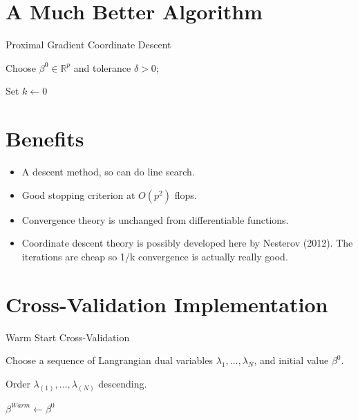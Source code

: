\documentclass[10pt, reqno]{article}
\numberwithin{equation}{section}
\newcommand{\R}{\mathbb{R}}
\begin{document}
\newpage
\section*{A Much Better Algorithm}

\vspace{.5cm}
\begin{algorithm}[H]
\caption{Proximal Gradient Coordinate Descent}
Choose $\beta^0 \in \R^p$ and tolerance $\delta > 0$;

Set $k \gets 0$

\end{algorithm}

\newpage
\section*{Benefits}

\begin{itemize}
\item A descent method, so can do line search.

\item Good stopping criterion at $O(p^2)$ flops.

\item Convergence theory is unchanged from differentiable functions.

\item Coordinate descent theory is possibly developed here by Nesterov (2012). The iterations are cheap so 1/k convergence is actually really good.

\end{itemize}

\newpage
\section*{Cross-Validation Implementation}

\vspace{.5cm}
\begin{algorithm}[H]
\caption{Warm Start Cross-Validation}
Choose a sequence of Langrangian dual variables $\lambda_1, \ldots, \lambda_N$, and initial value $\beta^0$.

Order $\lambda_{(1)}, \ldots, \lambda_{(N)}$ descending.

$\beta^{Warm} \gets \beta^0$ 


\end{algorithm}
\end{document}
